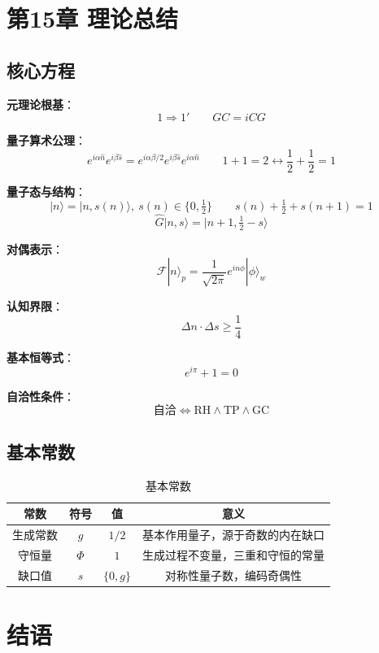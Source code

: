 \documentclass[12pt]{article}
\theoremstyle{definition}
\begin{document}
\section{第15章 理论总结}

\subsection{核心方程}

\textbf{元理论根基}：
\[
\boxed{1 \Rightarrow 1'} \qquad \boxed{GC = iCG}
\]

\textbf{量子算术公理}：
\[
\boxed{e^{i\alpha\hat{n}} e^{i\beta\hat{s}} = e^{i\alpha\beta/2} e^{i\beta\hat{s}} e^{i\alpha\hat{n}}} \qquad \boxed{1+1=2 \longleftrightarrow \frac12 + \frac12 = 1}
\]

\textbf{量子态与结构}：
\[
\boxed{|n\rangle = |n,s(n)\rangle,\ s(n) \in \{0,\tfrac12\}} \qquad \boxed{s(n) + \tfrac12 + s(n+1) = 1}
\]
\[
\boxed{\hat{G}|n,s\rangle = |n+1, \tfrac12 - s\rangle}
\]

\textbf{对偶表示}：
\[
\boxed{\mathcal{F}|n\rangle_p = \frac{1}{\sqrt{2\pi}} e^{in\phi}|\phi\rangle_w}
\]

\textbf{认知界限}：
\[
\boxed{\Delta n \cdot \Delta s \geq \frac14}
\]

\textbf{基本恒等式}：
\[
\boxed{e^{i\pi} + 1 = 0}
\]

\textbf{自洽性条件}：
\[
\boxed{\text{自洽} \iff \text{RH} \land \text{TP} \land \text{GC}}
\]

\subsection{基本常数}

\begin{table}[h]
\centering
\caption{基本常数}
\begin{tabular}{|c|c|c|c|}
\hline
\textbf{常数} & \textbf{符号} & \textbf{值} & \textbf{意义} \\
\hline
生成常数 & \(g\) & \(1/2\) & 基本作用量子，源于奇数的内在缺口 \\
守恒量 & \(\Phi\) & \(1\) & 生成过程不变量，三重和守恒的常量 \\
缺口值 & \(s\) & \(\{0, g\}\) & 对称性量子数，编码奇偶性 \\
\hline
\end{tabular}
\end{table}

\section*{结语}
\end{document}
